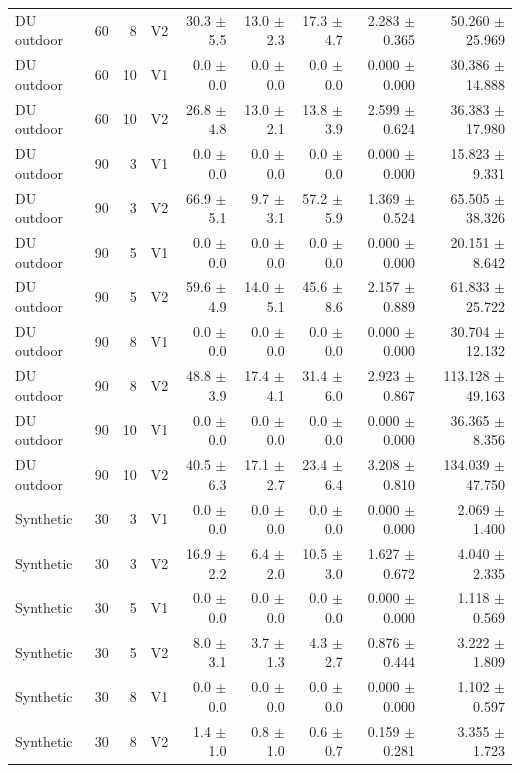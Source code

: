 \documentclass[10pt,a4paper]{article}
\begin{document}
\begin{landscape}
\begin{longtable}{@{}lrrlrrrrr@{}}
DU outdoor & 60 & 8 & V2 & 30.3 $\pm$ 5.5 & 13.0 $\pm$ 2.3 & 17.3 $\pm$ 4.7 & 2.283 $\pm$ 0.365 & 50.260 $\pm$ 25.969 \\
DU outdoor & 60 & 10 & V1 & 0.0 $\pm$ 0.0 & 0.0 $\pm$ 0.0 & 0.0 $\pm$ 0.0 & 0.000 $\pm$ 0.000 & 30.386 $\pm$ 14.888 \\
DU outdoor & 60 & 10 & V2 & 26.8 $\pm$ 4.8 & 13.0 $\pm$ 2.1 & 13.8 $\pm$ 3.9 & 2.599 $\pm$ 0.624 & 36.383 $\pm$ 17.980 \\
DU outdoor & 90 & 3 & V1 & 0.0 $\pm$ 0.0 & 0.0 $\pm$ 0.0 & 0.0 $\pm$ 0.0 & 0.000 $\pm$ 0.000 & 15.823 $\pm$ 9.331 \\
DU outdoor & 90 & 3 & V2 & 66.9 $\pm$ 5.1 & 9.7 $\pm$ 3.1 & 57.2 $\pm$ 5.9 & 1.369 $\pm$ 0.524 & 65.505 $\pm$ 38.326 \\
DU outdoor & 90 & 5 & V1 & 0.0 $\pm$ 0.0 & 0.0 $\pm$ 0.0 & 0.0 $\pm$ 0.0 & 0.000 $\pm$ 0.000 & 20.151 $\pm$ 8.642 \\
DU outdoor & 90 & 5 & V2 & 59.6 $\pm$ 4.9 & 14.0 $\pm$ 5.1 & 45.6 $\pm$ 8.6 & 2.157 $\pm$ 0.889 & 61.833 $\pm$ 25.722 \\
DU outdoor & 90 & 8 & V1 & 0.0 $\pm$ 0.0 & 0.0 $\pm$ 0.0 & 0.0 $\pm$ 0.0 & 0.000 $\pm$ 0.000 & 30.704 $\pm$ 12.132 \\
DU outdoor & 90 & 8 & V2 & 48.8 $\pm$ 3.9 & 17.4 $\pm$ 4.1 & 31.4 $\pm$ 6.0 & 2.923 $\pm$ 0.867 & 113.128 $\pm$ 49.163 \\
DU outdoor & 90 & 10 & V1 & 0.0 $\pm$ 0.0 & 0.0 $\pm$ 0.0 & 0.0 $\pm$ 0.0 & 0.000 $\pm$ 0.000 & 36.365 $\pm$ 8.356 \\
DU outdoor & 90 & 10 & V2 & 40.5 $\pm$ 6.3 & 17.1 $\pm$ 2.7 & 23.4 $\pm$ 6.4 & 3.208 $\pm$ 0.810 & 134.039 $\pm$ 47.750 \\
Synthetic & 30 & 3 & V1 & 0.0 $\pm$ 0.0 & 0.0 $\pm$ 0.0 & 0.0 $\pm$ 0.0 & 0.000 $\pm$ 0.000 & 2.069 $\pm$ 1.400 \\
Synthetic & 30 & 3 & V2 & 16.9 $\pm$ 2.2 & 6.4 $\pm$ 2.0 & 10.5 $\pm$ 3.0 & 1.627 $\pm$ 0.672 & 4.040 $\pm$ 2.335 \\
Synthetic & 30 & 5 & V1 & 0.0 $\pm$ 0.0 & 0.0 $\pm$ 0.0 & 0.0 $\pm$ 0.0 & 0.000 $\pm$ 0.000 & 1.118 $\pm$ 0.569 \\
Synthetic & 30 & 5 & V2 & 8.0 $\pm$ 3.1 & 3.7 $\pm$ 1.3 & 4.3 $\pm$ 2.7 & 0.876 $\pm$ 0.444 & 3.222 $\pm$ 1.809 \\
Synthetic & 30 & 8 & V1 & 0.0 $\pm$ 0.0 & 0.0 $\pm$ 0.0 & 0.0 $\pm$ 0.0 & 0.000 $\pm$ 0.000 & 1.102 $\pm$ 0.597 \\
Synthetic & 30 & 8 & V2 & 1.4 $\pm$ 1.0 & 0.8 $\pm$ 1.0 & 0.6 $\pm$ 0.7 & 0.159 $\pm$ 0.281 & 3.355 $\pm$ 1.723 \\

\end{longtable}
\end{landscape}
\end{document}
